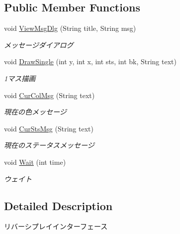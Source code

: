\subsection*{Public Member Functions}
\begin{DoxyCompactItemize}
\item 
void \hyperlink{interfacejp_1_1gr_1_1java__conf_1_1yuta__yoshinaga_1_1reversi_1_1model_1_1_reversi_play_interface_a189301a8c066e9421a26d1f2df95b56e}{View\+Msg\+Dlg} (String title, String msg)
\begin{DoxyCompactList}\small\item\em メッセージダイアログ \end{DoxyCompactList}\item 
void \hyperlink{interfacejp_1_1gr_1_1java__conf_1_1yuta__yoshinaga_1_1reversi_1_1model_1_1_reversi_play_interface_a6b51f93e409bbc76092e12a68c6fe710}{Draw\+Single} (int y, int x, int sts, int bk, String text)
\begin{DoxyCompactList}\small\item\em 1マス描画 \end{DoxyCompactList}\item 
void \hyperlink{interfacejp_1_1gr_1_1java__conf_1_1yuta__yoshinaga_1_1reversi_1_1model_1_1_reversi_play_interface_a73764de038c314fd103a91d402049a0c}{Cur\+Col\+Msg} (String text)
\begin{DoxyCompactList}\small\item\em 現在の色メッセージ \end{DoxyCompactList}\item 
void \hyperlink{interfacejp_1_1gr_1_1java__conf_1_1yuta__yoshinaga_1_1reversi_1_1model_1_1_reversi_play_interface_ad812b3735df400b42916b15e5c3ff9db}{Cur\+Sts\+Msg} (String text)
\begin{DoxyCompactList}\small\item\em 現在のステータスメッセージ \end{DoxyCompactList}\item 
void \hyperlink{interfacejp_1_1gr_1_1java__conf_1_1yuta__yoshinaga_1_1reversi_1_1model_1_1_reversi_play_interface_abd7fc4193840e8c7bdf95bc538e1b649}{Wait} (int time)
\begin{DoxyCompactList}\small\item\em ウェイト \end{DoxyCompactList}\end{DoxyCompactItemize}


\subsection{Detailed Description}
リバーシプレイインターフェース 


